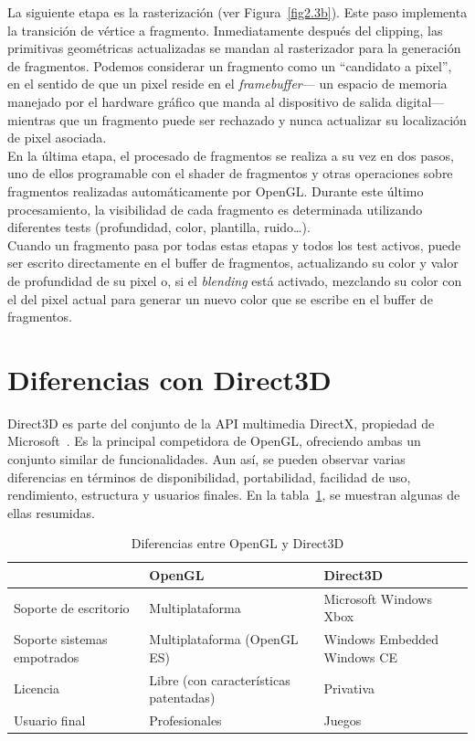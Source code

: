 La siguiente etapa es la rasterización (ver Figura~\ref{fig2.3b}). Este paso
implementa la transición de vértice a fragmento. Inmediatamente después del
clipping, las primitivas geométricas actualizadas se mandan al rasterizador para
la generación de fragmentos. Podemos considerar un fragmento como un ``candidato
a pixel'', en el sentido de que un pixel reside en el \textit{framebuffer}--- un
espacio de memoria manejado por el hardware gráfico que manda al dispositivo de
salida digital--- mientras que un fragmento puede ser rechazado y nunca
actualizar su localización de pixel asociada. \\

En la última etapa, el procesado de fragmentos se realiza a su vez en dos pasos,
uno de ellos programable con el shader de fragmentos y otras operaciones sobre
fragmentos realizadas automáticamente por OpenGL.  Durante este último
procesamiento, la visibilidad de cada fragmento es determinada utilizando
diferentes tests (profundidad, color, plantilla, ruido\ldots). \\

Cuando un fragmento pasa por todas estas etapas y todos los test activos, puede
ser escrito directamente en el buffer de fragmentos, actualizando su color y
valor de profundidad de su pixel o, si el \textit{blending} está activado,
mezclando su color con el del pixel actual para generar un nuevo color que se
escribe en el buffer de fragmentos.\\

\section{Diferencias con Direct3D}
\label{makereference2.4}

Direct3D es parte del conjunto de la API multimedia DirectX, propiedad de
Microsoft~\cite{Microsoft}. Es la principal competidora de OpenGL, ofreciendo
ambas un conjunto similar de funcionalidades. Aun así, se pueden observar varias
diferencias en términos de disponibilidad, portabilidad, facilidad de uso,
rendimiento, estructura y usuarios finales. En la tabla~\ref{tabla2.1}, se
muestran algunas de ellas resumidas.

\begin{table}[h]
	\centering
	\begin{tabular}{ | m{4cm} | m{5cm} | m{5cm} | }
		\hline
		& OpenGL & Direct3D \\
		\hline
		Soporte de escritorio & Multiplataforma & Microsoft Windows Xbox
		\\
		\hline
		Soporte sistemas empotrados & Multiplataforma (OpenGL ES) & Windows
		Embedded Windows CE \\
		\hline
		Licencia & Libre (con características patentadas) & Privativa
		\\
		\hline
		Usuario final & Profesionales & Juegos \\ 
		\hline
	\end{tabular}
	\caption{Diferencias entre OpenGL y Direct3D}
	\label{tabla2.1}
\end{table}

